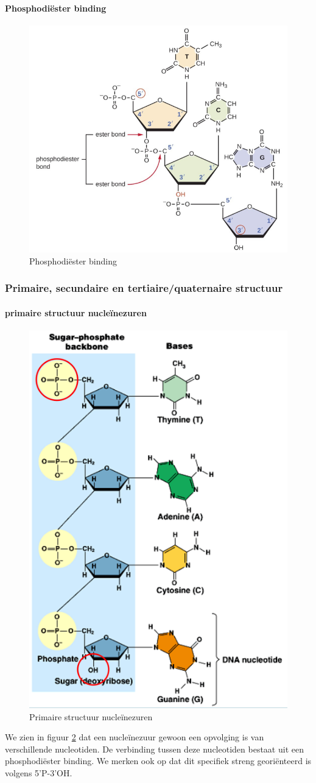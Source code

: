\documentclass[a4paper,kul]{kulakarticle} %
\begin{document}
\paragraph{Phosphodiëster binding}
\begin{figure}[h]
	\centering
	\includegraphics[width=0.5\linewidth]{EsterBinding}
	\caption[Ester binding]{Phosphodiëster binding}
	\label{fig:esterbinding}
\end{figure}
\newpage
\subsubsection{Primaire, secundaire en tertiaire/quaternaire structuur}
\paragraph{primaire structuur nucleïnezuren}
\begin{figure}[h]
	\centering
	\includegraphics[width=0.6\linewidth]{PrimaireStructuurDNA}
	\caption[Primaire structuur DNA]{Primaire structuur nucleïnezuren}
	\label{fig:primairestructuurdna}
\end{figure}
We zien in figuur \ref{fig:primairestructuurdna} dat een nucleïnezuur gewoon een opvolging is van verschillende nucleotiden. De verbinding tussen deze nucleotiden bestaat uit een phosphodiëster binding. We merken ook op dat dit specifiek streng georiënteerd is volgens 5'P-3'OH. 
\newpage
\end{document}
